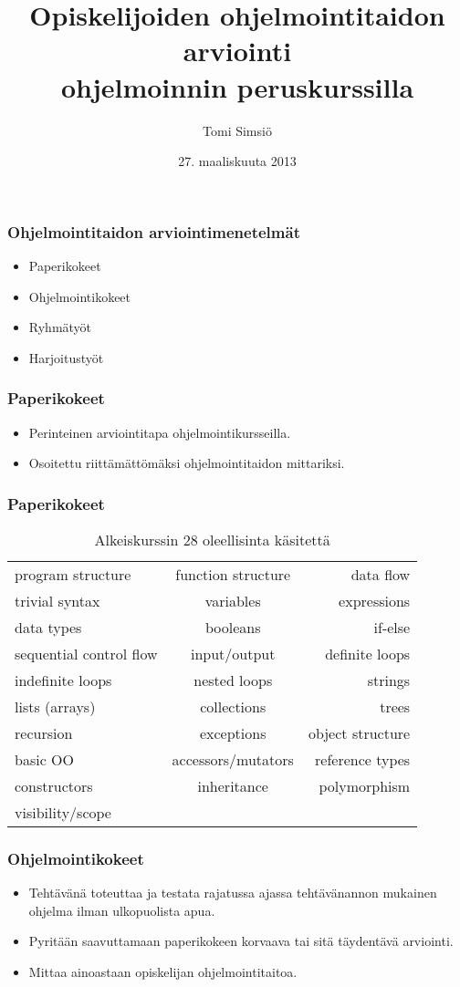 \documentclass[finnish]{beamer}
\author{Tomi Simsiö}
\title{Opiskelijoiden ohjelmointitaidon arviointi \texorpdfstring{\\}{}ohjelmoinnin peruskurssilla}
\institute{HELSINGIN YLIOPISTO\\Tietojenkäsittelytieteen laitos}
\date{27. maaliskuuta 2013}
\begin{document}
\frame{\titlepage}

\frame
{
  \frametitle{Ohjelmointitaidon arviointimenetelmät}
  \begin{itemize}
    \item Paperikokeet
    \item Ohjelmointikokeet
    \item Ryhmätyöt
    \item Harjoitustyöt
  \end{itemize}
}

\frame
{
  \frametitle{Paperikokeet}
  \begin{itemize}
    \item Perinteinen arviointitapa ohjelmointikursseilla.
    \item Osoitettu riittämättömäksi ohjelmointitaidon mittariksi.
  \end{itemize}
}

\frame
{
  \frametitle{Paperikokeet}
  \begin{table}
    \begin{tabular}{ l c r }
      program structure & function structure & data flow \\
      trivial syntax & variables & expressions \\
      data types & booleans & if-else \\
      sequential control flow & input/output & definite loops \\
      indefinite loops & nested loops & strings \\
      lists (arrays) & collections & trees \\
      recursion & exceptions & object structure \\
      basic OO & accessors/mutators & reference types \\
      constructors & inheritance & polymorphism \\
      visibility/scope \\
    \end{tabular}
  \caption{Alkeiskurssin 28 oleellisinta käsitettä}
  \label{tab:kasitteet}
  \end{table}
}

\frame
{
  \frametitle{Ohjelmointikokeet}
  \begin{itemize}
    \item Tehtävänä toteuttaa ja testata rajatussa ajassa tehtävänannon mukainen ohjelma ilman ulkopuolista apua.
    \item Pyritään saavuttamaan paperikokeen korvaava tai sitä täydentävä arviointi.
    \item Mittaa ainoastaan opiskelijan ohjelmointitaitoa.
  \end{itemize}
}
\end{document}
